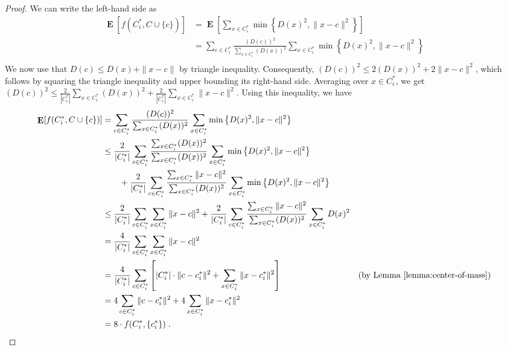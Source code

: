 \documentclass[9pt]{article}
\newcommand{\norm}[1]{\|{#1}\|}
\DeclareMathOperator*{\Exp}{\mathbf{E}}
\begin{document}
\begin{proof}
We can write the left-hand side as
\begin{align*}
\Exp[f(C_i^*, C \cup \{c\})]
& = \Exp\left[ \sum_{x \in C_i^*} \min\left\{D(x)^2, \norm{x-c}^2 \right\} \right] \\
& = \sum_{c \in C^*_i} \frac{(D(c))^2}{\sum_{x \in C_i^*} (D(x))^2} \sum_{x \in C_i^*} \min\left\{D(x)^2, \norm{x - c}^2\right\} \\
\end{align*}
We now use that $D(c) \le D(x) + \norm{x - c}$ by triangle inequality.
Consequently, $(D(c))^2 \le 2 (D(x))^2 + 2 \norm{x - c}^2$, which follows by
squaring the triangle inequality and upper bounding its right-hand side.
Averaging over $x \in C_i^*$, we get $(D(c))^2 \le \frac{2}{|C_i^*|} \sum_{x \in
C_i^*} (D(x))^2 + \frac{2}{|C_i^*|} \sum_{x \in C_i^*} \norm{x - c}^2$. Using this
inequality, we have
\begin{align*}
\Exp[f(C_i^*, C \cup \{c\})]
& = \sum_{c \in C^*_i} \frac{(D(c))^2}{\sum_{x \in C_i^*} (D(x))^2} \sum_{x \in C_i^*} \min\left\{D(x)^2, \norm{x - c}^2\right\} \\
& \le \frac{2}{|C^*_i|} \sum_{c \in C^*_i} \frac{\sum_{x \in C_i^*} (D(x))^2}{\sum_{x \in C_i^*} (D(x))^2} \sum_{x \in C_i^*} \min\left\{D(x)^2, \norm{x - c}^2\right\} \\
& \qquad + \frac{2}{|C^*_i|} \sum_{c \in C^*_i} \frac{\sum_{x \in C_i^*} \norm{x-c}^2}{\sum_{x \in C_i^*} (D(x))^2} \sum_{x \in C_i^*} \min\left\{D(x)^2, \norm{x - c}^2\right\} \\
& \le \frac{2}{|C^*_i|} \sum_{c \in C^*_i} \sum_{x \in C_i^*} \norm{x - c}^2 + \frac{2}{|C_i^*|} \sum_{c \in C^*_i} \frac{\sum_{x \in C_i^*} \norm{x-c}^2}{\sum_{x \in C_i^*} (D(x))^2} \sum_{x \in C_i^*} D(x)^2 \\
& = \frac{4}{|C^*_i|} \sum_{c \in C^*_i} \sum_{x \in C_i^*} \norm{x - c}^2 \\
& = \frac{4}{|C^*_i|} \sum_{c \in C^*_i} \left[ |C^*_i| \cdot \norm{c - c^*_i}^2 + \sum_{x \in C_i^*} \norm{x - c_i^*}^2 \right] & \text{(by Lemma~\ref{lemma:center-of-mass})} \\
& = 4 \sum_{c \in C^*_i} \norm{c - c^*_i}^2 + 4 \sum_{x \in C_i^*} \norm{x - c_i^*}^2 \\
& = 8 \cdot f(C^*_i, \{c^*_i\}) \; .
\end{align*}
\end{proof}
\end{document}
